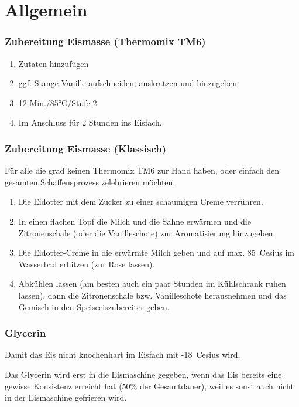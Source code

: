 \documentclass[12pt]{article}
\newcommand\degree[1]{\mbox{#1 \textdegree{} Cesius}}
\begin{document}
\newpage
\part{Allgemein}

\section{Zubereitung Eismasse (Thermomix TM6)}
	\begin{enumerate}
		\item Zutaten hinzufügen
		\item ggf. Stange Vanille aufschneiden, auskratzen und hinzugeben
		\item 12 Min./85°C/Stufe 2
		\item Im Anschluss für 2 Stunden ins Eisfach.
\end{enumerate}


\section{Zubereitung Eismasse (Klassisch)}
	Für alle die grad keinen Thermomix TM6 zur Hand haben, oder einfach den gesamten Schaffensprozess zelebrieren möchten.
	\begin{enumerate}
  		\item Die Eidotter mit dem Zucker zu einer schaumigen Creme verrühren.
  		\item In einen flachen Topf die Milch und die Sahne erwärmen und die Zitronenschale (oder die Vanilleschote) zur Aromatisierung hinzugeben.
  		\item Die Eidotter-Creme in die erwärmte Milch geben und auf max. \degree{85} im Wasserbad erhitzen (zur Rose lassen).
  		\item Abkühlen lassen (am besten auch ein paar Stunden im Kühlschrank ruhen lassen), dann die Zitronenschale bzw. Vanilleschote herausnehmen und das Gemisch in den Speiseeiszubereiter geben.
	\end{enumerate}


\section {Glycerin}
Damit das Eis nicht knochenhart im Eisfach mit \degree{-18} wird.

Das Glycerin wird erst in die Eismaschine gegeben, wenn das Eis bereits eine gewisse Konsistenz erreicht hat (50\% der Gesamtdauer), weil es sonst auch nicht in der Eismaschine gefrieren wird.
\end{document}
